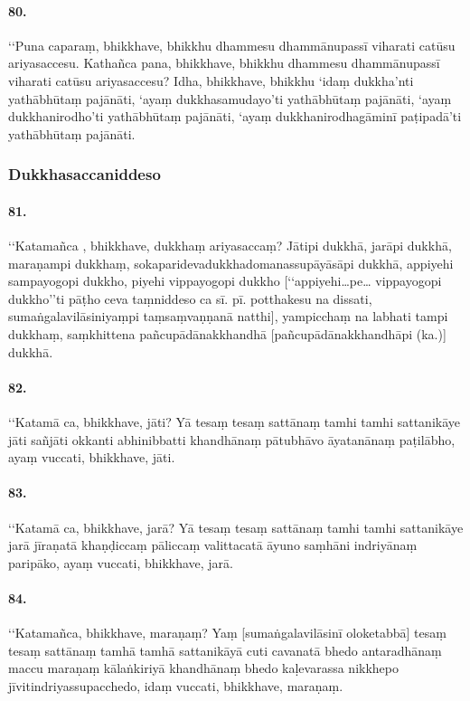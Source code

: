\paragraph{80.} ‘‘Puna caparaṃ, bhikkhave, bhikkhu dhammesu dhammānupassī viharati catūsu ariyasaccesu. Kathañca pana, bhikkhave, bhikkhu dhammesu dhammānupassī viharati catūsu ariyasaccesu? Idha, bhikkhave, bhikkhu ‘idaṃ dukkha’nti yathābhūtaṃ pajānāti, ‘ayaṃ dukkhasamudayo’ti yathābhūtaṃ pajānāti, ‘ayaṃ dukkhanirodho’ti yathābhūtaṃ pajānāti, ‘ayaṃ dukkhanirodhagāminī paṭipadā’ti yathābhūtaṃ pajānāti.


\subsubsection{Dukkhasaccaniddeso}

\paragraph{81.} ‘‘Katamañca , bhikkhave, dukkhaṃ ariyasaccaṃ? Jātipi dukkhā, jarāpi dukkhā, maraṇampi dukkhaṃ, sokaparidevadukkhadomanassupāyāsāpi dukkhā, appiyehi sampayogopi dukkho, piyehi vippayogopi dukkho [‘‘appiyehi…pe… vippayogopi dukkho’’ti pāṭho ceva taṃniddeso ca sī. pī. potthakesu na dissati, sumaṅgalavilāsiniyaṃpi taṃsaṃvaṇṇanā natthi], yampicchaṃ na labhati tampi dukkhaṃ, saṃkhittena pañcupādānakkhandhā [pañcupādānakkhandhāpi (ka.)] dukkhā.

\paragraph{82.} ‘‘Katamā ca, bhikkhave, jāti? Yā tesaṃ tesaṃ sattānaṃ tamhi tamhi sattanikāye jāti sañjāti okkanti abhinibbatti khandhānaṃ pātubhāvo āyatanānaṃ paṭilābho, ayaṃ vuccati, bhikkhave, jāti.

\paragraph{83.} ‘‘Katamā ca, bhikkhave, jarā? Yā tesaṃ tesaṃ sattānaṃ tamhi tamhi sattanikāye jarā jīraṇatā khaṇḍiccaṃ pāliccaṃ valittacatā āyuno saṃhāni indriyānaṃ paripāko, ayaṃ vuccati, bhikkhave, jarā.

\paragraph{84.} ‘‘Katamañca, bhikkhave, maraṇaṃ? Yaṃ [sumaṅgalavilāsinī oloketabbā] tesaṃ tesaṃ sattānaṃ tamhā tamhā sattanikāyā cuti cavanatā bhedo antaradhānaṃ maccu maraṇaṃ kālaṅkiriyā khandhānaṃ bhedo kaḷevarassa nikkhepo jīvitindriyassupacchedo, idaṃ vuccati, bhikkhave, maraṇaṃ.

